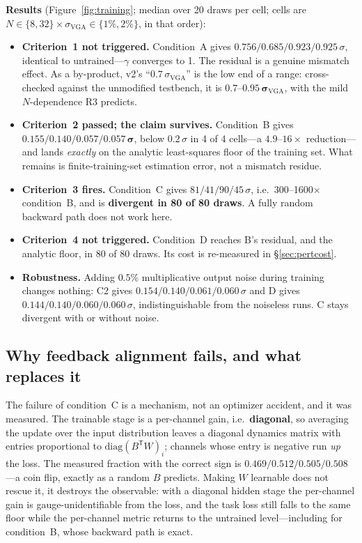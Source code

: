 \documentclass[11pt]{article}
\begin{document}
\textbf{Results} (Figure~\ref{fig:training}; median over 20 draws per cell; cells are $N\in\{8,32\}\times\sigma_{\mathrm{VGA}}\in\{1\%,2\%\}$, in that order):

\begin{itemize}[leftmargin=*]
\item \textbf{Criterion~1 not triggered.} Condition~A gives $0.756 / 0.685 / 0.923 / 0.925\,\sigma$, identical to untrained---$\gamma$ converges to 1. The residual is a genuine mismatch effect. As a by-product, v2's ``$0.7\,\sigma_{\mathrm{VGA}}$'' is the low end of a range: cross-checked against the unmodified testbench, it is $\mathbf{0.7}$--$\mathbf{0.95\,\sigma_{\mathrm{VGA}}}$, with the mild $N$-dependence R3 predicts.
\item \textbf{Criterion~2 passed; the claim survives.} Condition~B gives $\mathbf{0.155 / 0.140 / 0.057 / 0.057\,\sigma}$, below $0.2\,\sigma$ in 4 of 4 cells---a $4.9$--$16\times$ reduction---and lands \textit{exactly} on the analytic least-squares floor of the training set. What remains is finite-training-set estimation error, not a mismatch residue.
\item \textbf{Criterion~3 fires.} Condition~C gives $81 / 41 / 90 / 45\,\sigma$, i.e.\ 300--1600$\times$ condition~B, and is \textbf{divergent in 80 of 80 draws}. A fully random backward path does not work here.
\item \textbf{Criterion~4 not triggered.} Condition~D reaches B's residual, and the analytic floor, in 80 of 80 draws. Its cost is re-measured in \S\ref{sec:pertcost}.
\item \textbf{Robustness.} Adding $0.5\%$ multiplicative output noise during training changes nothing: C2 gives $0.154/0.140/0.061/0.060\,\sigma$ and D gives $0.144/0.140/0.060/0.060\,\sigma$, indistinguishable from the noiseless runs. C stays divergent with or without noise.
\end{itemize}

\subsection{Why feedback alignment fails, and what replaces it}
\label{sec:signconc}

The failure of condition~C is a mechanism, not an optimizer accident, and it was measured. The trainable stage is a per-channel gain, i.e.\ \textbf{diagonal}, so averaging the update over the input distribution leaves a diagonal dynamics matrix with entries proportional to $\mathrm{diag}(B^{\mathsf T}W)_i$; channels whose entry is negative run \textit{up} the loss. The measured fraction with the correct sign is $0.469 / 0.512 / 0.505 / 0.508$---a coin flip, exactly as a random $B$ predicts. Making $W$ learnable does not rescue it, it destroys the observable: with a diagonal hidden stage the per-channel gain is gauge-unidentifiable from the loss, and the task loss still falls to the same floor while the per-channel metric returns to the untrained level---including for condition~B, whose backward path is exact.
\end{document}
